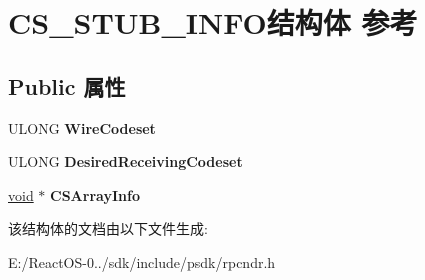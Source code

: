 \hypertarget{struct_c_s___s_t_u_b___i_n_f_o}{}\section{C\+S\+\_\+\+S\+T\+U\+B\+\_\+\+I\+N\+F\+O结构体 参考}
\label{struct_c_s___s_t_u_b___i_n_f_o}
\subsection*{Public 属性}
\begin{DoxyCompactItemize}
\item 
\mbox{\label{struct_c_s___s_t_u_b___i_n_f_o_a7e1c3143e2f6450efc06bfef75b7c515}} 
U\+L\+O\+NG {\bfseries Wire\+Codeset}
\item 
\mbox{\label{struct_c_s___s_t_u_b___i_n_f_o_af01c27029c9ef9cef77a6d5d147cb98e}} 
U\+L\+O\+NG {\bfseries Desired\+Receiving\+Codeset}
\item 
\mbox{\label{struct_c_s___s_t_u_b___i_n_f_o_a35a5b1bf597a9c2792624f62484f6bbd}} 
\hyperlink{interfacevoid}{void} $\ast$ {\bfseries C\+S\+Array\+Info}
\end{DoxyCompactItemize}


该结构体的文档由以下文件生成\+:\begin{DoxyCompactItemize}
\item 
E\+:/\+React\+O\+S-\/0../sdk/include/psdk/rpcndr.\+h\end{DoxyCompactItemize}
